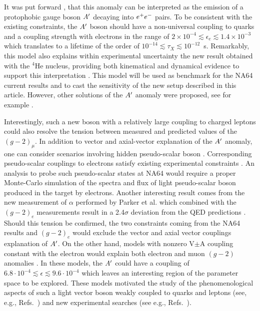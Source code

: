 It was put forward  \cite{Feng:2016jff,PhysRevD.95.035017}, that this anomaly can be interpreted as the emission of a protophobic gauge boson $A'$ decaying into $e^+e^-$ pairs. To be consistent with the existing constraints, the $A'$ boson should have a non-universal coupling to quarks and a coupling strength with electrons in the range of $2\times 10^{-4} \lesssim \epsilon_e \lesssim 1.4\times 10^{-3}$ which translates to a lifetime of the order of $10^{-14}\lesssim \tau_X \lesssim 10^{-12}$~s. Remarkably, this model also explains within experimental uncertainty the new result obtained with the $^4$He nucleus, providing both kinematical and dynamical evidence to support this interpretation \cite{Feng:2020mbt}. This model will be used as benchmark for the NA64 current results and to cast the sensitivity of the new setup described in this article. However, other solutions of the $A'$ anomaly were proposed, see for example \cite{Nam:2019osu, Seto:2016pks}.

Interestingly, such a new boson with a relatively large coupling to charged leptons could also resolve the tension between measured and predicted values of the $(g - 2)_{\mu}$. In addition to vector and axial-vector explanation of the $A'$ anomaly, one can consider scenarios involving hidden pseudo-scalar boson \cite{Ellwanger:2016wfe}. Corresponding pseudo-scalar couplings to electrons satisfy existing experimental constraints \cite{Andreas:2010ms,Adler:2004hp}. An analysis to probe such pseudo-scalar states at NA64 \cite{Kirpichnikov:2020tcf} would require a proper Monte-Carlo simulation of the spectra and flux of light pseudo-scalar boson produced in the target by electrons.
Another interesting result comes from the new measurement of $\alpha$ performed by Parker et al. \cite{Parker191} which combined with the $(g-2)_e$ measurements result in a 2.4$\sigma$ deviation from the QED predictions \cite{PhysRevLett.100.120801}. Should this tension be confirmed, the two constraints coming from the NA64 results and $(g - 2)_e$ would exclude the vector and axial vector couplings explanation of $A'$. On the other hand, models with nonzero V$\pm$A coupling constant with the electron would explain both electron and muon $(g - 2)$ anomalies \cite{Krasnikov:2019dgh}. In these models, the $A'$ could have a coupling of $6.8\cdot 10^{-4} \lesssim \epsilon \lesssim 9.6 \cdot 10^{-4}$ which leaves an interesting region of the parameter space to be explored.
These models motivated the study of the phenomenological aspects of such a light vector boson weakly coupled to quarks and leptons (see, e.g., Refs.~\cite{fayet1, fayet2, fayet3, fayet4,jk, cheng, Zhang:2017zap, ia, liang, bart}) 
and new experimental searches (see e.g., Refs.~\cite{battaglieri2017cosmic, nardi}).


